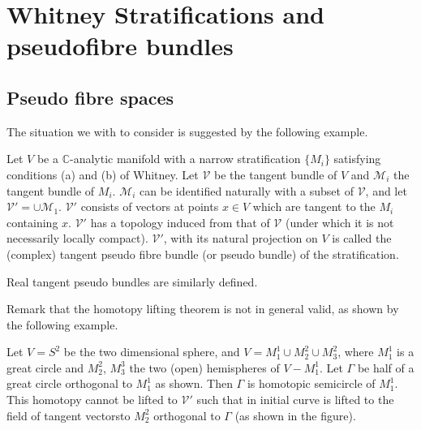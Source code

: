 \chapter{Whitney Stratifications and pseudofibre bundles}\label{chap4}

\section{Pseudo fibre spaces}\label{chap4-sec1}\pageoriginale

The situation we with to consider is suggested by the following example. 

Let $V$ be a $\mathbb{C}$-analytic manifold with a narrow
stratification  $\{ M_i \}$ satisfying conditions (a) and (b) of
Whitney. Let $\mathscr{V}$ be the tangent bundle of $V$ and
$\mathscr{M}_i$ the tangent bundle of $M_i$.  $\mathscr{M}_i$ can be
identified naturally with a subset of $\mathscr{V}$, and let
$\mathscr{V}' = \cup \mathscr{M}_1$. $\mathscr{V}'$ consists of vectors at
points $x \in V$ which are  tangent to the $M_i$ containing
$x$. $\mathscr{V}'$ has a topology induced from  that of
$\mathscr{V}$ (under which it is not necessarily locally
compact). $\mathscr{V}'$, 
with its natural projection on $V$ is called the (complex) tangent
pseudo fibre bundle (or pseudo bundle) of the stratification.  
 
Real tangent pseudo bundles are similarly defined.
 
Remark that the homotopy lifting theorem is not in general  valid, as
shown by the following example. 
 
Let $V = S^2$ be the two dimensional sphere, and  $V = M^1_1\cup
M^2_2 \cup M^2_3$, where $M^1_1$ is a great circle and $M^2_2$,
$M^3_3$ the two (open) hemispheres of $V - M^1_1$. Let $\Gamma$ be
half of a great circle  orthogonal to $M^1_1$ as shown. Then $\Gamma$
is homotopic semicircle of $M^1_1$. This homotopy cannot be lifted to
$\mathscr{V}'$  such that in initial curve is lifted to the field of
tangent vectors\pageoriginale to $M^2_2$ orthogonal to $\Gamma$ (as
shown in the figure).  

\begin{figure}[H]
\end{figure}

